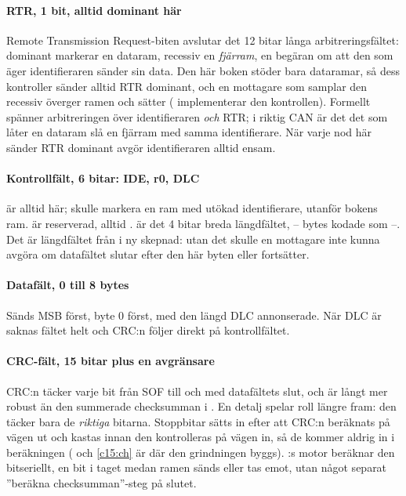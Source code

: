 \paragraph{RTR, 1 bit, alltid dominant här}
Remote Transmission Request-biten avslutar det 12 bitar långa arbitreringsfältet: dominant markerar
en dataram, recessiv en \emph{fjärram}, en begäran om att den som äger identifieraren sänder sin
data. Den här boken stöder bara dataramar, så dess kontroller sänder alltid RTR dominant, och en
mottagare som samplar den recessiv överger ramen och sätter  (
implementerar den kontrollen). Formellt spänner arbitreringen över identifieraren \emph{och} RTR; i
riktig CAN är det det som låter en dataram slå en fjärram med samma identifierare. När varje nod här
sänder RTR dominant avgör identifieraren alltid ensam.

\paragraph{Kontrollfält, 6 bitar: IDE, r0, DLC}
 är alltid  här;  skulle markera en ram med utökad identifierare, utanför
bokens ram.  är reserverad, alltid .  är det 4 bitar breda längdfältet,
-- bytes kodade som --. Det är längdfältet från
 i ny skepnad: utan det skulle en mottagare inte kunna avgöra om datafältet
slutar efter den här byten eller fortsätter.

\paragraph{Datafält, 0 till 8 bytes}
Sänds MSB först, byte 0 först, med den längd DLC annonserade. När DLC är  saknas fältet helt
och CRC:n följer direkt på kontrollfältet.

\paragraph{CRC-fält, 15 bitar plus en avgränsare}
CRC:n täcker varje bit från SOF till och med datafältets slut, och är långt mer robust än den
summerade checksumman i . En detalj spelar roll längre fram: den täcker bara
de \emph{riktiga} bitarna. Stoppbitar sätts in efter att CRC:n beräknats på vägen ut och kastas innan
den kontrolleras på vägen in, så de kommer aldrig in i beräkningen ( och
\ref{c15:ch} är där den grindningen byggs). :s motor beräknar den bitseriellt, en bit
i taget medan ramen sänds eller tas emot, utan något separat ”beräkna checksumman”-steg på slutet.

